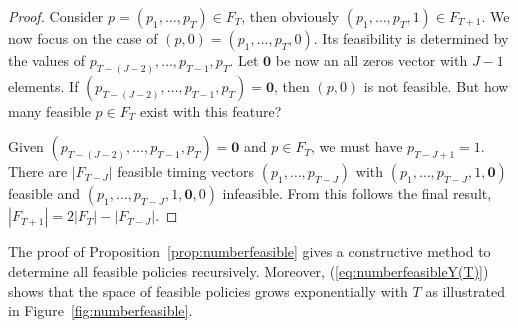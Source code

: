 \begin{proof}
Consider $p=(p_1,\ldots,p_{T})\in F_{T}$, then obviously $(p_1,\ldots,p_{T},1)\in F_{T+1}$. We now focus on the case of $(p,0)=(p_1,\ldots,p_{T},0)$. Its feasibility is determined by the values of $p_{T-(J-2)},\ldots, p_{T-1},p_T$. Let $\boldsymbol{0}$ be now an all zeros vector with $J-1$ elements. If $(p_{T-(J-2)},\ldots, p_{T-1},p_T)=\boldsymbol{0}$, then $(p,0)$ is not feasible. But how many feasible $p\in F_{T}$ exist with this feature?

Given $(p_{T-(J-2)},\ldots, p_{T-1},p_T)=\boldsymbol{0}$ and $p\in F_{T}$, we must have $p_{T-J+1}=1$. There are $|F_{T-J}|$ feasible timing vectors $(p_1,\ldots,p_{T-J})$ with $(p_1,\ldots,p_{T-J},1,\boldsymbol{0})$  feasible and  $(p_1,\ldots,p_{T-J},1,\boldsymbol{0},0)$ infeasible.
From this follows the final result, $|F_{T+1}|= 2|F_{T}| -|F_{T-J}|$.
\end{proof}




The proof of Proposition~\ref{prop:numberfeasible} gives a constructive method to determine all feasible policies recursively. Moreover, (\ref{eq:numberfeasibleY(T)}) shows that the space of feasible policies grows exponentially with $T$ as illustrated in Figure~\ref{fig:numberfeasible}.



